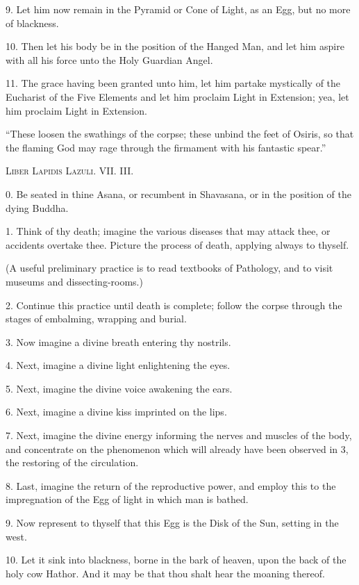 9. Let him now remain in the Pyramid or Cone of Light, as an Egg, but no more of blackness.

10. Then let his body be in the position of the Hanged Man, and let him aspire with all his force unto the Holy Guardian Angel.

11. The grace having been granted unto him, let him partake mystically of the Eucharist of the Five Elements and let him proclaim Light in Extension; yea, let him proclaim Light in Extension.


\pagebreak



\epigraph{\enquote{These loosen the swathings of the corpse; these unbind the feet of Osiris, so that the flaming God may rage through the firmament with his fantastic spear.}}{\textsc{Liber Lapidis Lazuli. VII. III.}}


0. Be seated in thine Asana, or recumbent in Shavasana, or in the position of the dying Buddha.

1. Think of thy death; imagine the various diseases that may attack thee, or accidents overtake thee. Picture the process of death, applying always to thyself.

(A useful preliminary practice is to read textbooks of Pathology, and to visit museums and dissecting-rooms.)

2. Continue this practice until death is complete; follow the corpse through the stages of embalming, wrapping and burial.

3. Now imagine a divine breath entering thy nostrils.

4. Next, imagine a divine light enlightening the eyes.

5. Next, imagine the divine voice awakening the ears.

6. Next, imagine a divine kiss imprinted on the lips.

7. Next, imagine the divine energy informing the nerves and muscles of the body, and concentrate on the phenomenon which will already have been observed in 3, the restoring of the circulation.

8. Last, imagine the return of the reproductive power, and employ this to the impregnation of the Egg of light in which man is bathed.

9. Now represent to thyself that this Egg is the Disk of the Sun, setting in the west.

10. Let it sink into blackness, borne in the bark of heaven, upon the back of the holy cow Hathor. And it may be that thou shalt hear the moaning thereof.


